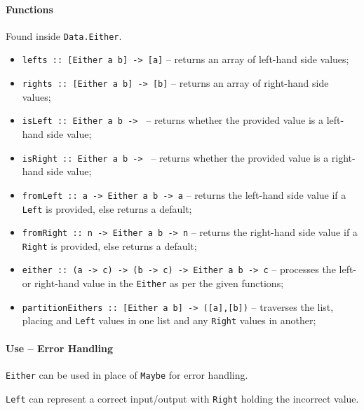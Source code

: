 \paragraph{Functions}
Found inside \texttt{Data.Either}.
\begin{itemize}
  \item \texttt{lefts :: [Either a b] -> [a]} -- returns an array of left-hand side values;
  \item \texttt{rights :: [Either a b] -> [b]} -- returns an array of right-hand side values;
  \item \texttt{isLeft :: Either a b -> } -- returns whether the provided value is a left-hand side value;
  \item \texttt{isRight :: Either a b -> } -- returns whether the provided value is a right-hand side value;
  \item \texttt{fromLeft :: a -> Either a b -> a} -- returns the left-hand side value if a \texttt{Left} is provided, else returns a default;
  \item \texttt{fromRight :: n -> Either a b -> n} -- returns the right-hand side value if a \texttt{Right} is provided, else returns a default;
  \item \texttt{either :: (a -> c) -> (b -> c) -> Either a b -> c} -- processes the left- or right-hand value in the \texttt{Either} as per the given functions;
  \item \texttt{partitionEithers :: [Either a b] -> ([a],[b])} -- traverses the list, placing and \texttt{Left} values in one list and any \texttt{Right} values in another;
\end{itemize}

\paragraph{Use -- Error Handling}
\texttt{Either} can be used in place of \texttt{Maybe} for error handling.

\texttt{Left} can represent a correct input/output with \texttt{Right} holding the incorrect value.